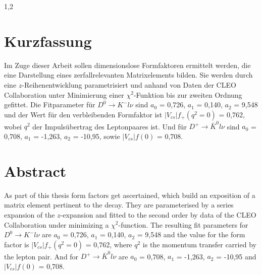 \documentclass[11pt,a4paper,twoside,draft]{report}
\begin{document}
\begin{spacing}{1,2}
\newpage



\thispagestyle{empty}
\section*{Kurzfassung}
Im Zuge dieser Arbeit sollen dimensionslose Formfaktoren ermittelt werden, die eine Darstellung eines zerfallrelevanten Matrixelements bilden. Sie werden
durch eine $z$-Reihenentwicklung parametrisiert und anhand von Daten der CLEO Collaboration unter Minimierung einer $\chi^2$-Funktion bis zur 
zweiten Ordnung gefittet. Die Fitparameter für $D^0\rightarrow  K^- l \nu$ sind $a_0$ = 0,726, $a_1$ = 0,140, $a_2$ = 9,548 und der Wert für den verbleibenden Formfaktor ist $|V_{cs}|f_+(q^2=0)$ = 0,762, wobei 
$q^2$ der Impulsübertrag des Leptonpaares ist. Und für $D^+\rightarrow \bar K^0 l \nu$ sind $a_0$ = 0,708, $a_1$ = -1,263, $a_2$ = -10,95, sowie $|V_{cs}|f(0)$ = 0,708.


\section*{Abstract}
As part of this thesis form factors get ascertained, which build an exposition of a matrix element pertinent to the decay. They are parameterised by a
series expansion of the $z$-expansion and fitted to the second order by data of the CLEO Collaboration under minimizing a $\chi^2$-function. The resulting
fit parameters for $D^0\rightarrow  K^- l \nu$ are $a_0$ = 0,726, $a_1$ = 0,140, $a_2$ = 9,548 and the value for the form factor is $|V_{cs}|f_+(q^2=0)$ = 0,762, where $q^2$ is the momentum transfer carried by
the lepton pair. And for $D^+\rightarrow \bar K^0 l \nu$ are $a_0$ = 0,708, $a_1$ = -1,263, $a_2$ = -10,95 and $|V_{cs}|f(0)$ = 0,708.


\end{spacing}
\end{document}
